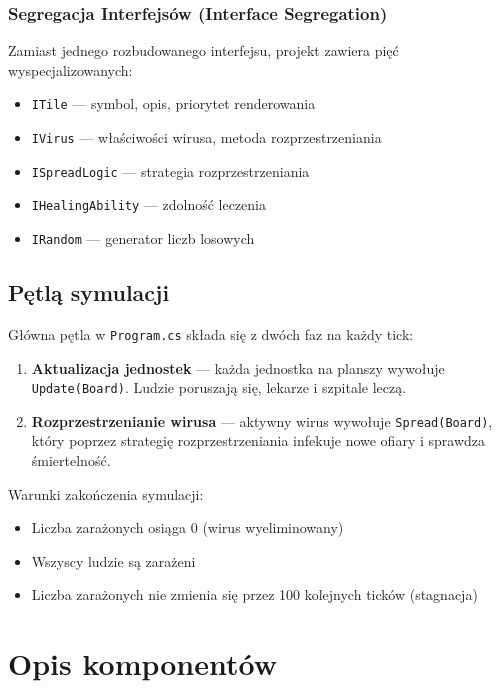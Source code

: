 \documentclass[a4paper,12pt]{article}
\begin{document}
\subsubsection{Segregacja Interfejsów (Interface Segregation)}

Zamiast jednego rozbudowanego interfejsu, projekt zawiera pięć wyspecjalizowanych:

\begin{itemize}
    \item \texttt{ITile} --- symbol, opis, priorytet renderowania
    \item \texttt{IVirus} --- właściwości wirusa, metoda rozprzestrzeniania
    \item \texttt{ISpreadLogic} --- strategia rozprzestrzeniania
    \item \texttt{IHealingAbility} --- zdolność leczenia
    \item \texttt{IRandom} --- generator liczb losowych
\end{itemize}

\subsection{Pętlą symulacji}

Główna pętla w \texttt{Program.cs} składa się z dwóch faz na każdy tick:

\begin{enumerate}
    \item \textbf{Aktualizacja jednostek} --- każda jednostka na planszy wywołuje
          \texttt{Update(Board)}. Ludzie poruszają się, lekarze i szpitale leczą.
    \item \textbf{Rozprzestrzenianie wirusa} --- aktywny wirus wywołuje \texttt{Spread(Board)},
          który poprzez strategię rozprzestrzeniania infekuje nowe ofiary i sprawdza śmiertelność.
\end{enumerate}

Warunki zakończenia symulacji:
\begin{itemize}
    \item Liczba zarażonych osiąga 0 (wirus wyeliminowany)
    \item Wszyscy ludzie są zarażeni
    \item Liczba zarażonych nie zmienia się przez 100 kolejnych ticków (stagnacja)
\end{itemize}

\section{Opis komponentów}
\end{document}
